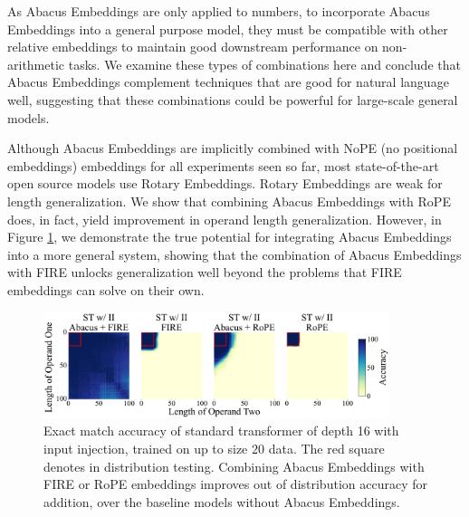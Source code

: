 \documentclass{article}
\begin{document}

As Abacus Embeddings are only applied to numbers, to incorporate Abacus Embeddings into a general purpose model, they must be compatible with other relative embeddings to maintain good downstream performance on non-arithmetic tasks.
We examine these types of combinations here and conclude that Abacus Embeddings complement techniques that are good for natural language well, suggesting that these combinations could be powerful for large-scale general models.

Although Abacus Embeddings are implicitly combined with NoPE (no positional embeddings) embeddings for all experiments seen so far, most state-of-the-art open source models use Rotary Embeddings. 
Rotary Embeddings are weak for length generalization.
We show that combining Abacus Embeddings with RoPE does, in fact, yield improvement in operand length generalization.
However, in Figure \ref{fig:combined_abacus}, we demonstrate the true potential for integrating Abacus Embeddings into a more general system, showing that the combination of Abacus Embeddings with FIRE unlocks generalization well beyond the problems that FIRE embeddings can solve on their own.

\begin{figure}[ht!]
    \centering
    \includegraphics[width=0.9\textwidth]{Figures/grids/grids_plot_nine.pdf}
    \caption{
    Exact match accuracy of standard transformer of depth 16 with input injection, trained on up to size \(20\) data.
    The red square denotes in distribution testing.
    Combining Abacus Embeddings with FIRE or RoPE embeddings improves out of distribution accuracy for addition, over the baseline models without Abacus Embeddings.
    }
    \label{fig:combined_abacus}
\end{figure}
\end{document}
